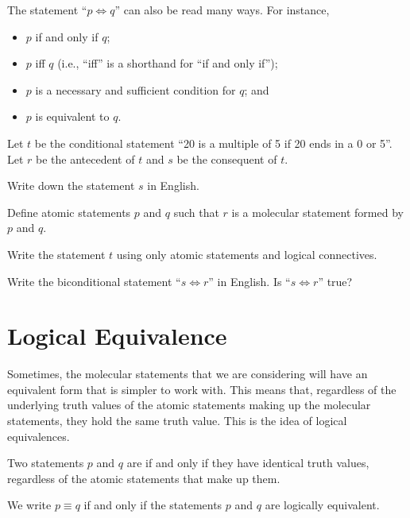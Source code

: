 \begin{remark}
    The statement ``$p \iff q$'' can also be read many ways. For instance,
    \begin{itemize}
        \item $p$ if and only if $q$;
        \item $p$ iff $q$ (i.e., ``iff'' is a shorthand for ``if and only if'');
        \item $p$ is a necessary and sufficient condition for $q$; and
        \item $p$ is equivalent to $q$.
    \end{itemize}
\end{remark}

\begin{exercise}[(Bi)conditionals]
    Let $t$ be the conditional statement ``20 is a multiple of 5 if 20 ends in a 0 or 5''. Let $r$ be the antecedent of $t$ and $s$ be the consequent of $t$.
    \begin{partquestions}{\roman*}
        \item Write down the statement $s$ in English.
        \item Define atomic statements $p$ and $q$ such that $r$ is a molecular statement formed by $p$ and $q$.
        \item Write the statement $t$ using only atomic statements and logical connectives.
        \item Write the biconditional statement ``$s \iff r$'' in English. Is ``$s \iff r$'' true?
    \end{partquestions}
\end{exercise}

\section{Logical Equivalence}
Sometimes, the molecular statements that we are considering will have an equivalent form that is simpler to work with. This means that, regardless of the underlying truth values of the atomic statements making up the molecular statements, they hold the same truth value. This is the idea of logical equivalences.

\begin{definition}
    Two statements $p$ and $q$ are  if and only if they have identical truth values, regardless of the atomic statements that make up them.

    We write $p \equiv q$ if and only if the statements $p$ and $q$ are logically equivalent.
\end{definition}

